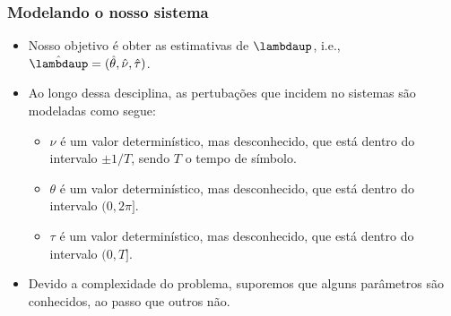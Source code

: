 \begin{frame}[t]
    \frametitle{Modelando o nosso sistema}

    \begin{itemize}
        \item \alert{Nosso objetivo é obter as estimativas de \(\boldsymbol{\lambdaup}\), i.e., \(\hat{\boldsymbol{\lambdaup}} = (\hat{\theta},\hat{\nu},\hat{\tau})\)}.
        \item Ao longo dessa desciplina, as pertubações que incidem no sistemas são modeladas como segue:
        \begin{itemize}
            \item \(\nu\) é um valor determinístico, mas desconhecido, que está dentro do intervalo \(\pm 1/T\), sendo \(T\) o tempo de símbolo.
            \item \(\theta\) é um valor determinístico, mas desconhecido, que está dentro do intervalo \((0,2\pi]\).
            \item \(\tau\) é um valor determinístico, mas desconhecido, que está dentro do intervalo \((0,T]\).
        \end{itemize}
        \item Devido a complexidade do problema, suporemos que alguns parâmetros são conhecidos, ao passo que outros não.
    \end{itemize}

\end{frame}

